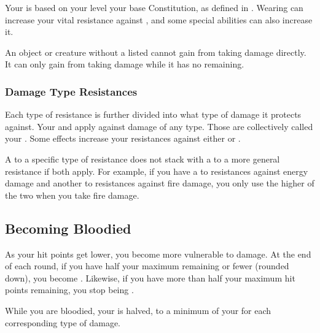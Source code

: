         Your  is based on your level \add your base Constitution, as defined in .
        Wearing  can increase your vital resistance against , and some special abilities can also increase it.

         An object or creature without a listed  cannot gain  from taking damage directly.
        It can only gain  from taking damage while it has no  remaining.

    \subsubsection{Damage Type Resistances}\label{Damage Type Resistances}
        Each type of resistance is further divided into what type of damage it protects against.
        Your  and  apply against damage of any type.
        Those are collectively called your .
        Some effects increase your resistances against either  or .

         A  to a specific type of resistance does not stack with a  to a more general resistance if both apply.
        For example, if you have a  to resistances against energy damage and another  to resistances against fire damage, you only use the higher of the two when you take fire damage.

    \subsection{Becoming Bloodied}\label{Becoming Bloodied}
        As your hit points get lower, you become more vulnerable to damage.
        At the end of each round, if you have half your maximum  remaining or fewer (rounded down), you become .
        Likewise, if you have more than half your maximum hit points remaining, you stop being .

        While you are bloodied, your  is halved, to a minimum of your  for each corresponding type of damage.

